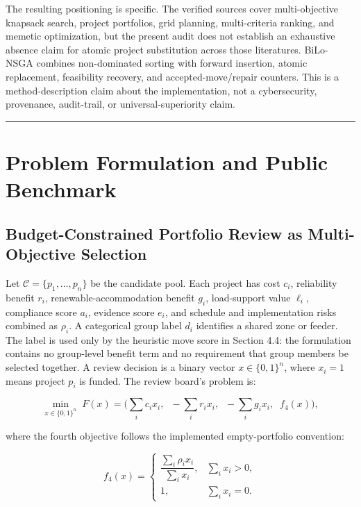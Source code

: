 \documentclass[applsci,article,submit,moreauthors]{Definitions/mdpi}
\begin{document}
The resulting positioning is specific. The verified sources cover multi-objective knapsack search, project portfolios, grid planning, multi-criteria ranking, and memetic optimization, but the present audit does not establish an exhaustive absence claim for atomic project substitution across those literatures. BiLo-NSGA combines non-dominated sorting with forward insertion, atomic replacement, feasibility recovery, and accepted-move/repair counters. This is a method-description claim about the implementation, not a cybersecurity, provenance, audit-trail, or universal-superiority claim.

\begin{center}\rule{0.5\linewidth}{0.5pt}\end{center}

\section{Problem Formulation and Public Benchmark}\label{problem-formulation-and-public-benchmark}

\subsection{Budget-Constrained Portfolio Review as Multi-Objective Selection}\label{budget-constrained-portfolio-review-as-multi-objective-selection}

Let \(\mathcal{C} = \{p_1, \dots, p_n\}\) be the candidate pool. Each project has cost \(c_i\), reliability benefit \(r_i\), renewable-accommodation benefit \(g_i\), load-support value \(\ell_i\), compliance score \(a_i\), evidence score \(e_i\), and schedule and implementation risks combined as \(\rho_i\). A categorical group label \(d_i\) identifies a shared zone or feeder. The label is used only by the heuristic move score in Section 4.4: the formulation contains no group-level benefit term and no requirement that group members be selected together. A review decision is a binary vector \(x \in \{0,1\}^n\), where \(x_i = 1\) means project \(p_i\) is funded. The review board's problem is:

\[
\min_{x \in \{0,1\}^n} \; F(x) = \Big( \textstyle\sum_i c_i x_i, \;\; -\sum_i r_i x_i, \;\; -\sum_i g_i x_i, \;\; f_4(x) \Big),
\]

where the fourth objective follows the implemented empty-portfolio convention:

\[
f_4(x)=
\begin{cases}
\dfrac{\sum_i \rho_i x_i}{\sum_i x_i}, & \sum_i x_i>0,\\[4pt]
1, & \sum_i x_i=0.
\end{cases}
\]
\end{document}
